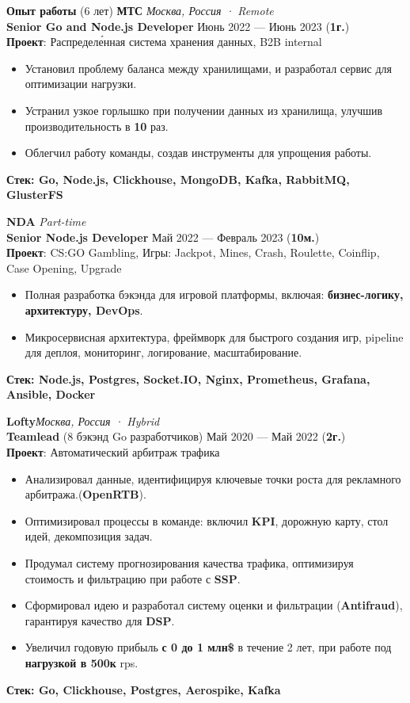 \documentclass{resume}
\begin{document}
\begin{rSection}{\textbf{Опыт работы} (6 лет) }
    \textbf{МТС} \hfill \textit{Москва, Россия · Remote} \\
    \textbf{Senior Go and Node.js Developer}  \hfill Июнь 2022 --- Июнь 2023 ({\textbf{1г.}}) \\
    \textbf{Проект}: Распределе́нная система хранения данных, B2B internal
    \begin{itemize}
        \item Установил проблему баланса между хранилищами, и разработал сервис для оптимизации нагрузки.
        \item Устранил узкое горлышко при получении данных из хранилища, улучшив производительность в \textbf{10} раз\@.
        \item Облегчил работу команды, создав инструменты для упрощения работы\@.
    \end{itemize}
    \textbf{Стек: Go, Node.js, Clickhouse, MongoDB, Kafka, RabbitMQ, GlusterFS}

    \textbf{NDA} \hfill \textit{Part-time} \\
    \textbf{Senior Node.js Developer}  \hfill Май 2022 --- Февраль 2023 ({\textbf{10м.}}) \\
    \textbf{Проект}: CS:GO Gambling, Игры: Jackpot, Mines, Crash, Roulette, Coinflip, Case Opening, Upgrade
    \begin{itemize}
        \item Полная разработка бэкэнда для игровой платформы, включая: \textbf{бизнес-логику, архитектуру, DevOps}\@.
        \item Микросервисная архитектура, фреймворк для быстрого создания игр, pipeline для деплоя, мониторинг, логирование, масштабирование\@.
    \end{itemize}
    \textbf{Стек: Node.js, Postgres, Socket.IO, Nginx, Prometheus, Grafana, Ansible, Docker}

    \textbf{Lofty}\hfill \textit{Москва, Россия · Hybrid} \\
    \textbf{Teamlead} (8 бэкэнд Go разработчиков) \hfill Май 2020 --- Май 2022 ({\textbf{2г.}}) \\
    \textbf{Проект}: Автоматический арбитраж трафика
    \begin{itemize}
        \item Анализировал данные, идентифицируя ключевые точки роста для рекламного арбитража.(\textbf{OpenRTB})\@.
        \item Оптимизировал процессы в команде: включил \textbf{KPI}, дорожную карту, стол идей, декомпозиция задач\@.
        \item Продумал систему прогнозирования качества трафика, оптимизируя стоимость и фильтрацию при работе с \textbf{SSP}\@.
        \item Сформировал идею и разработал систему оценки и фильтрации (\textbf{Antifraud}), гарантируя качество для \textbf{DSP}\@.
        \item Увеличил годовую прибыль \textbf{с 0 до 1 млн\$} в течение 2 лет, при работе под \textbf{нагрузкой в 500к} rps\@.
    \end{itemize}
    \textbf{Стек: Go, Clickhouse, Postgres, Aerospike, Kafka}


\end{rSection}
\end{document}
